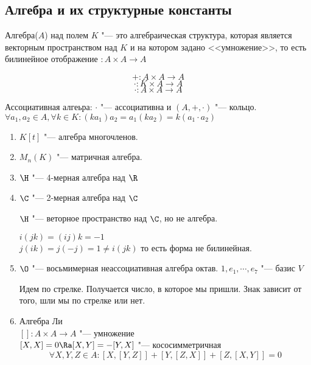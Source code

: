 \subsection{Алгебра и их структурные константы}
\begin{Def}
Алгебра($A$) над полем $K$ "--- это алгебраическая  структура, которая является векторным пространством
над $K$ и на котором задано <<умножение>>, то есть билинейное отображение $\colon A \times A \to A$

$$+ \colon A \times A \to A$$
$$\cdot \colon K \times A \to A$$
$$\cdot \colon A \times A \to A$$

\end{Def}
\begin{Def}
    Ассоциативная алгеьра: $\cdot$ "--- ассоциативна и $(A, +, \cdot)$ "--- кольцо.\\ 
    $\forall a_1, a_2 \in A, \forall k \in K \colon (ka_1)a_2 = a_1(ka_2) = k(a_1 \cdot a_2)$\\
\end{Def}
\begin{exmp}   
    \begin{enumerate}
    \item
    $K[t]$ "--- алгебра многочленов.\\
    \item
    $M_n(K)$ "--- матричная алгебра.\\
    \item
    $\H$ "--- 4-мерная алгебра над $\R$\\
    \item
    $\C$ "--- 2-мерная алгебра над $\C$\\
    \begin{Rem}
    $\H$ "--- веторное пространство над $\C$, но не алгебра. 

    $i(jk) = (ij) k = -1$\\
    $j(ik) = j(-j) = 1 \ne i(jk)$
     то есть форма не билинейная. 
    \end{Rem}
    \item
    $\O$ "--- восьмимерная неассоциативная алгебра октав. 
    $1, e_1, \cdots, e_7$ "--- базис $V$

        
    Идем по стрелке. Получается число, в которое мы пришли. Знак зависит от того, шли мы по стрелке или нет. 
    \item Алгебра Ли \\
    $[]\colon A \times A \to A $ "--- умножение\\
    $[X, X] = 0 \Ra [X, Y] = -[Y, X]$ "--- кососимметричная\\
    $$\forall X, Y, Z\in A \colon [X, [Y, Z]] + [Y, [Z, X]] + [Z, [X, Y]] = 0$$
    \end{enumerate}
\end{exmp}

